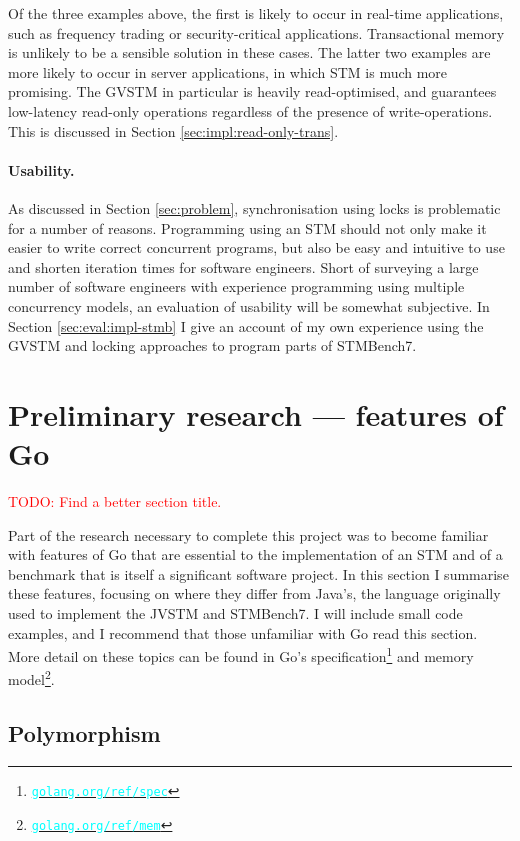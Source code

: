 \documentclass[12pt,a4paper,oneside,openright]{report}
\newcommand{\URL}[1]{\href{https://#1}{\textcolor{cyan}{\texttt{#1}}}}
\newcommand{\todo}[1]{\textcolor{red}{TODO: #1}}
\begin{document}
Of the three examples above, the first is likely to occur in real-time
applications, such as frequency trading or security-critical
applications. Transactional memory is unlikely to be a sensible
solution in these cases. The latter two examples are more likely to
occur in server applications, in which STM is much more promising. The
GVSTM in particular is heavily read-optimised, and guarantees
low-latency read-only operations regardless of the presence of
write-operations. This is discussed in Section
\ref{sec:impl:read-only-trans}.

\paragraph{Usability.} As discussed in Section \ref{sec:problem},
synchronisation using locks is problematic for a number of
reasons. Programming using an STM should not only make it easier to
write correct concurrent programs, but also be easy and intuitive to
use and shorten iteration times for software engineers. Short of
surveying a large number of software engineers with experience
programming using multiple concurrency models, an evaluation of
usability will be somewhat subjective. In Section
\ref{sec:eval:impl-stmb} I give an account of my own experience using
the GVSTM and locking approaches to program parts of STMBench7.

\section{Preliminary research --- features of Go}
\label{sec:prep:research}
\todo{Find a better section title.}

Part of the research necessary to complete this project was to become
familiar with features of Go that are essential to the implementation
of an STM and of a benchmark that is itself a significant software
project. In this section I summarise these features, focusing on where
they differ from Java's, the language originally used to implement the
JVSTM and STMBench7. I will include small code examples, and I
recommend that those unfamiliar with Go read this section. More detail
on these topics can be found in Go's
specification\footnote{\URL{golang.org/ref/spec}} and memory
model\footnote{\URL{golang.org/ref/mem}}.

\subsection{Polymorphism}
\label{sec:prep:polymorphism}
\end{document}
